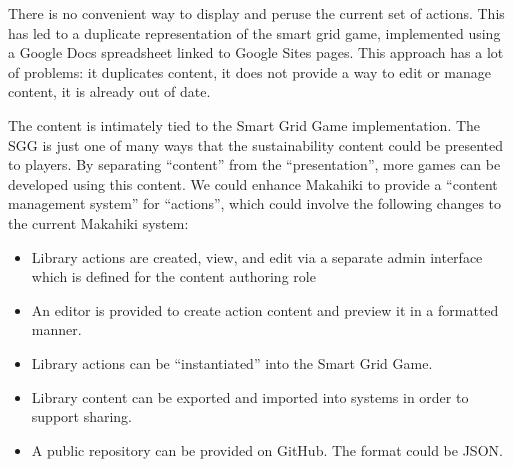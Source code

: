 There is no convenient way to display and peruse the current set of actions. This has led to a duplicate representation of the smart grid game, implemented using a Google Docs spreadsheet linked to Google Sites pages. This approach has a lot of problems: it duplicates content, it does not provide a way to edit or manage content, it is already out of date.

The content is intimately tied to the Smart Grid Game implementation. The SGG is just one of many ways that the sustainability content could be presented to players. By separating ``content'' from the ``presentation'', more games can be developed using this content. We could enhance Makahiki to provide a ``content management system'' for ``actions'', which could involve the following changes to the current Makahiki system:
\begin{itemize}
\item Library actions are created, view, and edit via a separate admin interface which is defined for the content authoring role
\item An editor is provided to create action content and preview it in a formatted manner.
\item Library actions can be ``instantiated'' into the Smart Grid Game. 
\item Library content can be exported and imported into systems in order to support sharing. 
\item A public repository can be provided on GitHub. The format could be JSON.
\end{itemize}

